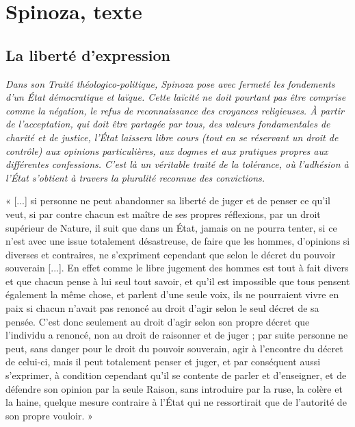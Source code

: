 
\chapter{Spinoza, texte}

\section{La liberté d'expression}
%


{\it Dans son Traité théologico-politique, Spinoza pose avec fermeté les fondements
d’un État démocratique et laïque. Cette laïcité ne doit pourtant pas être comprise
comme la négation, le refus de reconnaissance des croyances religieuses. À partir
de l'acceptation, qui doit être partagée par tous, des valeurs fondamentales de
charité et de justice, l'État laissera libre cours (tout en se réservant un droit de
contrôle) aux opinions particulières, aux dogmes et aux pratiques propres aux
différentes confessions. C’est là un véritable traité de la tolérance, où l'adhésion à
l’État s'obtient à travers la pluralité reconnue des convictions.}

« [...] si personne ne peut abandonner sa liberté de juger et de penser ce qu'il veut,
si par contre chacun est maître de ses propres réflexions, par un droit supérieur de
Nature, il suit que dans un État, jamais on ne pourra tenter, si ce n’est avec une issue
totalement désastreuse, de faire que les hommes, d'opinions si diverses et
contraires, ne s'expriment cependant que selon le décret du pouvoir souverain [...].
En effet comme le libre jugement des hommes est tout à fait divers et que chacun
pense à lui seul tout savoir, et qu'il est impossible que tous pensent également la
même chose, et parlent d'une seule voix, ils ne pourraient vivre en paix si chacun
n'avait pas renoncé au droit d'agir selon le seul décret de sa pensée. C'est donc seulement au droit d'agir selon son propre décret que l'individu a renoncé, non au
droit de raisonner et de juger ; par suite personne ne peut, sans danger pour le droit
du pouvoir souverain, agir à l'encontre du décret de celui-ci, mais il peut totalement penser et juger, et par conséquent aussi s'exprimer, à condition cependant
qu'il se contente de parler et d'enseigner, et de défendre son opinion par la seule
Raison, sans introduire par la ruse, la colère et la haine, quelque mesure contraire à
l'État qui ne ressortirait que de l'autorité de son propre vouloir. »

